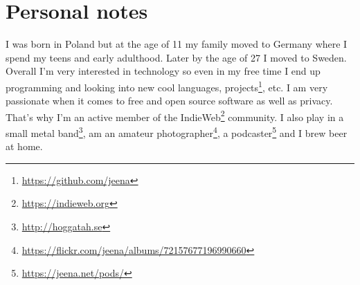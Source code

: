 \documentclass{twocolcv}
\begin{document}
\section*{Personal notes}
  {I was born in Poland but at the age of 11 my family moved to Germany where I spend my teens and early adulthood. Later by the age of 27 I moved to Sweden.}
  {Overall I'm very interested in technology so even in my free time I end up programming and looking into new cool languages, projects\footnote{\url{https://github.com/jeena}}, etc. I am very passionate when it comes to free and open source software as well as privacy. That's why I'm an active member of the IndieWeb\footnote{\url{https://indieweb.org}} community.}
  {I also play in a small metal band\footnote{\url{http://hoggatah.se}}, am an amateur photographer\footnote{\url{https://flickr.com/jeena/albums/72157677196990660}}, a podcaster\footnote{\url{https://jeena.net/pods/}} and I brew beer at home.}
\end{document}
